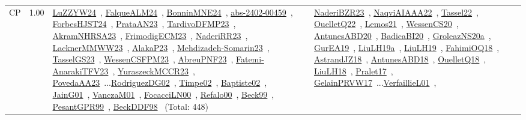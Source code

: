 {\begin{longtable}{p{3cm}r>{\raggedright\arraybackslash}p{6cm}>{\raggedright\arraybackslash}p{6cm}>{\raggedright\arraybackslash}p{8cm}}
\index{CP}\index{CP!CP}CP &  1.00 & \href{../works/LuZZYW24.pdf}{LuZZYW24}~\cite{LuZZYW24}, \href{../works/FalqueALM24.pdf}{FalqueALM24}~\cite{FalqueALM24}, \href{../works/BonninMNE24.pdf}{BonninMNE24}~\cite{BonninMNE24}, \href{../works/abs-2402-00459.pdf}{abs-2402-00459}~\cite{abs-2402-00459}, \href{../works/ForbesHJST24.pdf}{ForbesHJST24}~\cite{ForbesHJST24}, \href{../works/PrataAN23.pdf}{PrataAN23}~\cite{PrataAN23}, \href{../works/TardivoDFMP23.pdf}{TardivoDFMP23}~\cite{TardivoDFMP23}, \href{../works/AkramNHRSA23.pdf}{AkramNHRSA23}~\cite{AkramNHRSA23}, \href{../works/FrimodigECM23.pdf}{FrimodigECM23}~\cite{FrimodigECM23}, \href{../works/NaderiRR23.pdf}{NaderiRR23}~\cite{NaderiRR23}, \href{../works/LacknerMMWW23.pdf}{LacknerMMWW23}~\cite{LacknerMMWW23}, \href{../works/AlakaP23.pdf}{AlakaP23}~\cite{AlakaP23}, \href{../works/Mehdizadeh-Somarin23.pdf}{Mehdizadeh-Somarin23}~\cite{Mehdizadeh-Somarin23}, \href{../works/TasselGS23.pdf}{TasselGS23}~\cite{TasselGS23}, \href{../works/WessenCSFPM23.pdf}{WessenCSFPM23}~\cite{WessenCSFPM23}, \href{../works/AbreuPNF23.pdf}{AbreuPNF23}~\cite{AbreuPNF23}, \href{../works/Fatemi-AnarakiTFV23.pdf}{Fatemi-AnarakiTFV23}~\cite{Fatemi-AnarakiTFV23}, \href{../works/YuraszeckMCCR23.pdf}{YuraszeckMCCR23}~\cite{YuraszeckMCCR23}, \href{../works/PovedaAA23.pdf}{PovedaAA23}~\cite{PovedaAA23}...\href{../works/RodriguezDG02.pdf}{RodriguezDG02}~\cite{RodriguezDG02}, \href{../works/Timpe02.pdf}{Timpe02}~\cite{Timpe02}, \href{../works/Baptiste02.pdf}{Baptiste02}~\cite{Baptiste02}, \href{../works/JainG01.pdf}{JainG01}~\cite{JainG01}, \href{../works/VanczaM01.pdf}{VanczaM01}~\cite{VanczaM01}, \href{../works/FocacciLN00.pdf}{FocacciLN00}~\cite{FocacciLN00}, \href{../works/Refalo00.pdf}{Refalo00}~\cite{Refalo00}, \href{../works/Beck99.pdf}{Beck99}~\cite{Beck99}, \href{../works/PesantGPR99.pdf}{PesantGPR99}~\cite{PesantGPR99}, \href{../works/BeckDDF98.pdf}{BeckDDF98}~\cite{BeckDDF98} (Total: 448) & \href{../works/NaderiBZR23.pdf}{NaderiBZR23}~\cite{NaderiBZR23}, \href{../works/NaqviAIAAA22.pdf}{NaqviAIAAA22}~\cite{NaqviAIAAA22}, \href{../works/Tassel22.pdf}{Tassel22}~\cite{Tassel22}, \href{../works/OuelletQ22.pdf}{OuelletQ22}~\cite{OuelletQ22}, \href{../works/Lemos21.pdf}{Lemos21}~\cite{Lemos21}, \href{../works/WessenCS20.pdf}{WessenCS20}~\cite{WessenCS20}, \href{../works/AntunesABD20.pdf}{AntunesABD20}~\cite{AntunesABD20}, \href{../works/BadicaBI20.pdf}{BadicaBI20}~\cite{BadicaBI20}, \href{../works/GroleazNS20a.pdf}{GroleazNS20a}~\cite{GroleazNS20a}, \href{../works/GurEA19.pdf}{GurEA19}~\cite{GurEA19}, \href{../works/LiuLH19a.pdf}{LiuLH19a}~\cite{LiuLH19a}, \href{../works/LiuLH19.pdf}{LiuLH19}~\cite{LiuLH19}, \href{../works/FahimiOQ18.pdf}{FahimiOQ18}~\cite{FahimiOQ18}, \href{../works/AstrandJZ18.pdf}{AstrandJZ18}~\cite{AstrandJZ18}, \href{../works/AntunesABD18.pdf}{AntunesABD18}~\cite{AntunesABD18}, \href{../works/OuelletQ18.pdf}{OuelletQ18}~\cite{OuelletQ18}, \href{../works/LiuLH18.pdf}{LiuLH18}~\cite{LiuLH18}, \href{../works/Pralet17.pdf}{Pralet17}~\cite{Pralet17}, \href{../works/GelainPRVW17.pdf}{GelainPRVW17}~\cite{GelainPRVW17}...\href{../works/VerfaillieL01.pdf}{VerfaillieL01}~\cite{VerfaillieL01}, 
\end{longtable}}
